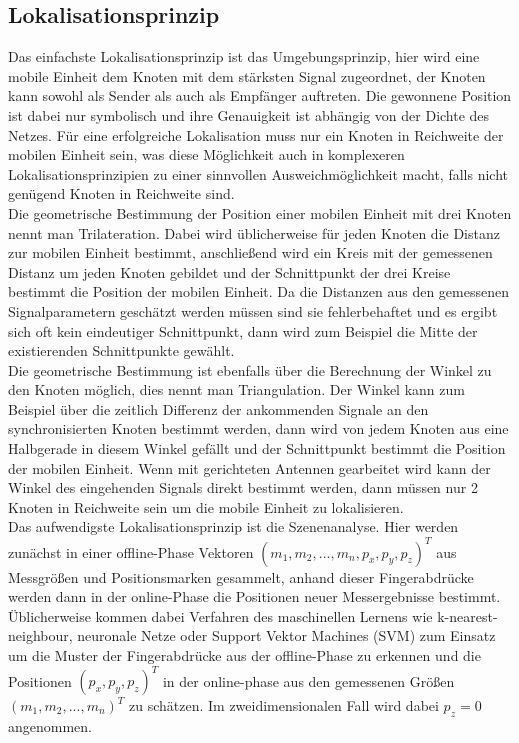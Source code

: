 \subsection{Lokalisationsprinzip}
Das einfachste Lokalisationsprinzip ist das Umgebungsprinzip, hier wird eine mobile Einheit dem Knoten mit dem stärksten Signal zugeordnet, der Knoten kann sowohl als Sender als auch als Empfänger auftreten. Die gewonnene Position ist dabei nur symbolisch und ihre Genauigkeit ist abhängig von der Dichte des Netzes. Für eine erfolgreiche Lokalisation muss nur ein Knoten in Reichweite der mobilen Einheit sein, was diese Möglichkeit auch in komplexeren Lokalisationsprinzipien zu einer sinnvollen Ausweichmöglichkeit macht, falls nicht genügend Knoten in Reichweite sind. \\
Die geometrische Bestimmung der Position einer mobilen Einheit mit drei Knoten nennt man Trilateration. Dabei wird üblicherweise für jeden Knoten die Distanz zur mobilen Einheit bestimmt, anschließend wird ein Kreis mit der gemessenen Distanz um jeden Knoten gebildet und der Schnittpunkt der drei Kreise bestimmt die Position der mobilen Einheit. Da die Distanzen aus den gemessenen Signalparametern geschätzt werden müssen sind sie fehlerbehaftet und es ergibt sich oft kein eindeutiger Schnittpunkt, dann wird zum Beispiel die Mitte der existierenden Schnittpunkte gewählt. \\
Die geometrische Bestimmung ist ebenfalls über die Berechnung der Winkel zu den Knoten möglich, dies nennt man Triangulation. Der Winkel kann zum Beispiel über die zeitlich Differenz der ankommenden Signale an den synchronisierten Knoten bestimmt werden, dann wird von jedem Knoten aus eine Halbgerade in diesem Winkel gefällt und der Schnittpunkt bestimmt die Position der mobilen Einheit. Wenn mit gerichteten Antennen gearbeitet wird kann der Winkel des eingehenden Signals direkt bestimmt werden, dann müssen nur 2 Knoten in Reichweite sein um die mobile Einheit zu lokalisieren. \\
Das aufwendigste Lokalisationsprinzip ist die Szenenanalyse. Hier werden zunächst in einer offline-Phase Vektoren $(m_1,m_2,...,m_n,p_x,p_y,p_z)^T$ aus Messgrößen und Positionsmarken gesammelt, anhand dieser Fingerabdrücke werden dann in der online-Phase die Positionen neuer Messergebnisse bestimmt. Üblicherweise kommen dabei Verfahren des maschinellen Lernens wie k-nearest-neighbour, neuronale Netze oder Support Vektor Machines (SVM) zum Einsatz um die Muster der Fingerabdrücke aus der offline-Phase zu erkennen und die Positionen $(p_x,p_y,p_z)^T$ in der online-phase aus den gemessenen Größen $(m_1,m_2,...,m_n)^T$ zu schätzen. Im zweidimensionalen Fall wird dabei $p_z = 0$ angenommen.

